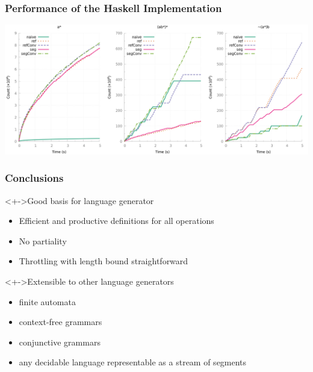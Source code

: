 \documentclass[pdftex,aspectratio=169]{beamer}
\begin{document}
\begin{frame}
  \frametitle{Performance of the Haskell Implementation}
  \begin{center}
    \includegraphics[width=\linewidth]{../measure/haskell_all.png}
  \end{center}
\end{frame}
\begin{frame}
  \frametitle{Conclusions}
  \begin{block}<+->{Good basis for language generator}
    \begin{itemize}
    \item Efficient and productive definitions for all operations
    \item No partiality
    \item Throttling with length bound straightforward
    \end{itemize}
  \end{block}
  \begin{block}<+->{Extensible to other language generators}
    \begin{itemize}
    \item finite automata
    \item context-free grammars
    \item conjunctive grammars
    \item any decidable language representable as a stream of segments 
    \end{itemize}
  \end{block}
\end{frame}
\end{document}
